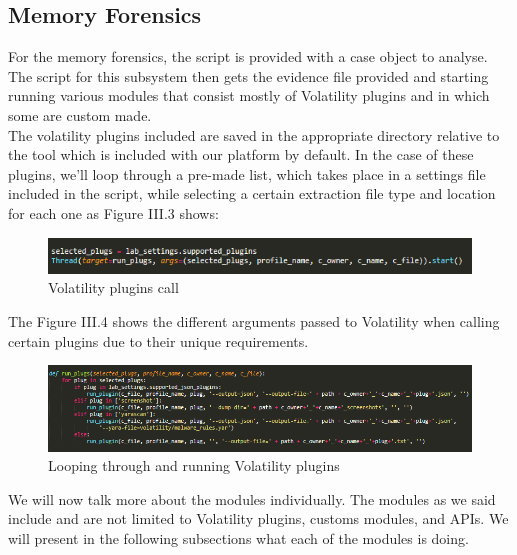 \subsection{Memory Forensics}
For the memory forensics, the script is provided with a case object to analyse. The script for this subsystem then gets the evidence file provided and starting running various modules that consist mostly of Volatility plugins and in which some are custom made.\\
The volatility plugins included are saved in the appropriate directory relative to the tool which is included with our platform by default. In the case of these plugins, we'll loop through a pre-made list, which takes place in a settings file included in the script, while selecting a certain extraction file type and location for each one as Figure III.3 shows:
\begin{figure}[H]
\centering
\includegraphics[width=1\columnwidth]{Figures/1_.png}
\caption{Volatility plugins call}
\end{figure}
The Figure III.4 shows the different arguments passed to Volatility when calling certain plugins due to their unique requirements.
\begin{figure}[H]
\centering
\includegraphics[width=1\columnwidth]{Figures/2_.png}
\caption{Looping through and running Volatility plugins}
\end{figure}
We will now talk more about the modules individually. The modules as we said include and are not limited to Volatility plugins, customs modules, and APIs. We will present in the following subsections what each of the modules is doing.

